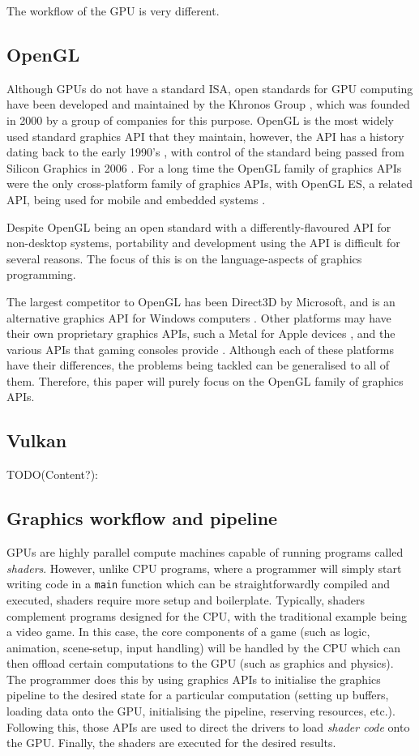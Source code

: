 \documentclass[a4paper,12pt,twoside,openright]{report}
\begin{document}
The workflow of the GPU is very different.

\subsection{OpenGL}

Although GPUs do not have a standard ISA, open standards for GPU computing have
been developed and maintained by the Khronos Group \cite{TODO}, which was
founded in 2000 by a group of companies for this purpose. OpenGL is the most
widely used standard graphics API that they maintain, however, the API has a
history dating back to the early 1990's \cite{TODO}, with control of the
standard being passed from Silicon Graphics in 2006 \cite{TODO}. For a long
time the OpenGL family of graphics APIs were the only cross-platform family of
graphics APIs, with OpenGL ES, a related API, being used for mobile and
embedded systems \cite{TODO}.

Despite OpenGL being an open standard with a differently-flavoured API for
non-desktop systems, portability and development using the API is difficult for
several reasons. The focus of this is on the language-aspects of graphics
programming.

The largest competitor to OpenGL has been Direct3D by Microsoft, and is an
alternative graphics API for Windows computers \cite{TODO}. Other platforms may
have their own proprietary graphics APIs, such a Metal for Apple devices
\cite{TODO}, and the various APIs that gaming consoles provide \cite{TODO}.
Although each of these platforms have their differences, the problems being
tackled can be generalised to all of them. Therefore, this paper will purely
focus on the OpenGL family of graphics APIs.

\subsection{Vulkan}

TODO(Content?):

\subsection{Graphics workflow and pipeline}

GPUs are highly parallel compute machines capable of running programs called
\textit{shaders}. However, unlike CPU programs, where a programmer will simply
start writing code in a \texttt{main} function which can be straightforwardly
compiled and executed, shaders require more setup and boilerplate. Typically,
shaders complement programs designed for the CPU, with the traditional example
being a video game. In this case, the core components of a game (such as logic,
animation, scene-setup, input handling) will be handled by the CPU which can
then offload certain computations to the GPU (such as graphics and physics).
The programmer does this by using graphics APIs to initialise the graphics
pipeline to the desired state for a particular computation (setting up buffers,
loading data onto the GPU, initialising the pipeline, reserving resources,
etc.). Following this, those APIs are used to direct the drivers to load
\textit{shader code} onto the GPU. Finally, the shaders are executed for the
desired results.
\end{document}
